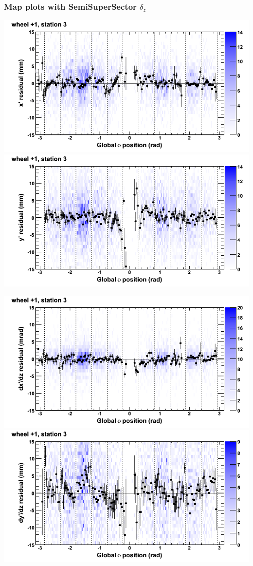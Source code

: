 \documentclass[compress]{beamer}
\begin{document}
\begin{frame}
\frametitle{Map plots with SemiSuperSector $\delta_z$}
\includegraphics[width=0.5\linewidth]{zfit_mapplots/DTvsphi_st3whD_x.png}
\includegraphics[width=0.5\linewidth]{zfit_mapplots/DTvsphi_st3whD_y.png}

\includegraphics[width=0.5\linewidth]{zfit_mapplots/DTvsphi_st3whD_dxdz.png}
\includegraphics[width=0.5\linewidth]{zfit_mapplots/DTvsphi_st3whD_dydz.png}
\end{frame}
\end{document}
